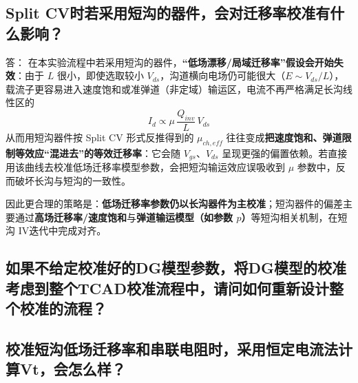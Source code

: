 \documentclass[12pt, a4paper, UTF8]{article}
\begin{document}
\subsection{Split CV时若采用短沟的器件，会对迁移率校准有什么影响？}
答：
在本实验流程中若采用短沟的器件，\textbf{“低场漂移/局域迁移率”假设会开始失效}：由于 $L$ 很小，即使选取较小 $V_{ds}$，沟道横向电场仍可能很大（$E\sim V_{ds}/L$），载流子更容易进入速度饱和或准弹道（非定域）输运区，电流不再严格满足长沟线性区的
\begin{equation}
I_d\propto \mu\,\frac{Q_{inv}}{L}\,V_{ds}
\end{equation}
从而用短沟器件按 Split CV 形式反推得到的 $\mu_{ch,eff}$ 往往变成\textbf{把速度饱和、弹道限制等效应“混进去”的等效迁移率}：它会随 $V_{gs}$、$V_{ds}$ 呈现更强的偏置依赖。若直接用该曲线去校准低场迁移率模型参数，会把短沟输运效应误吸收到 $\mu$ 参数中，反而破坏长沟与短沟的一致性。

因此更合理的策略是：\textbf{低场迁移率参数仍以长沟器件为主校准}；短沟器件的偏差主要通过\textbf{高场迁移率/速度饱和}与\textbf{弹道输运模型（如参数 $p$）}等短沟相关机制，在短沟 IV迭代中完成对齐。

\subsection{如果不给定校准好的DG模型参数，将DG模型的校准考虑到整个TCAD校准流程中，请问如何重新设计整个校准的流程？}

\subsection{校准短沟低场迁移率和串联电阻时，采用恒定电流法计算Vt，会怎么样？}
\end{document}
